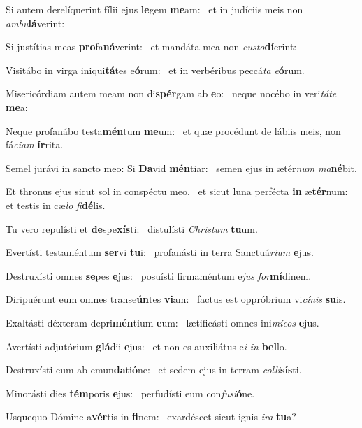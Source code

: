 \item Si autem derelíquerint fílii ejus \textbf{le}gem \textbf{me}am:~\psstar{} et in judíciis meis non \textit{ambu}\textbf{lá}verint:
\item Si justítias meas \textbf{pro}fa\textbf{ná}ve\-rint:~\psstar{} et mandáta mea non \textit{custo}\textbf{dí}erint:
\item Visitábo in virga iniqui\textbf{tá}tes e\textbf{ó}rum:~\psstar{} et in verbéribus peccá\textit{ta} \textit{e}\textbf{ó}rum.
\item Misericórdiam autem meam non di\textbf{spér}gam ab \textbf{e}o:~\psstar{} neque nocébo in veri\textit{táte} \textbf{me}a:
\item Neque profanábo testa\textbf{mén}tum \textbf{me}um:~\psstar{} et quæ procédunt de lábiis meis, non fá\textit{ciam} \textbf{ír}rita.
\item Semel jurávi in sancto meo: Si \textbf{Da}vid \textbf{mén}tiar:~\psstar{} semen ejus in ætér\textit{num} \textit{ma}\textbf{né}bit.
\item Et thronus ejus sicut sol in conspéctu meo,~\pscross{} et sicut luna perfécta \textbf{in} æ\textbf{tér}num:~\psstar{} et testis in cæ\textit{lo} \textit{fi}\textbf{dé}lis.
\item Tu vero repulísti et \textbf{de}spe\textbf{xís}ti:~\psstar{} distulísti \textit{Christum} \textbf{tu}um.
\item Evertísti testaméntum \textbf{ser}vi \textbf{tu}i:~\psstar{} profanásti in terra Sanctuá\textit{rium} \textbf{e}jus.
\item Destruxísti omnes \textbf{se}pes \textbf{e}jus:~\psstar{} posuísti firmaméntum e\textit{jus} \textit{for}\textbf{mí}dinem.
\item Diripuérunt eum omnes transe\textbf{ún}tes \textbf{vi}am:~\psstar{} factus est oppróbrium vi\textit{cínis} \textbf{su}is.
\item Exaltásti déxteram depri\textbf{mén}tium \textbf{e}um:~\psstar{} lætificásti omnes ini\textit{mícos} \textbf{e}jus.
\item Avertísti adjutórium \textbf{glá}dii \textbf{e}jus:~\psstar{} et non es auxiliátus e\textit{i} \textit{in} \textbf{bel}lo.
\item Destruxísti eum ab emun\textbf{da}ti\-\textbf{ó}ne:~\psstar{} et sedem ejus in terram \textit{colli}\textbf{sís}ti.
\item Minorásti dies \textbf{tém}poris \textbf{e}jus:~\psstar{} perfudísti eum con\textit{fusi}\textbf{ó}ne.
\item Usquequo Dómine a\textbf{vér}tis in \textbf{fi}nem:~\psstar{} exardéscet sicut ignis \textit{ira} \textbf{tu}a?
